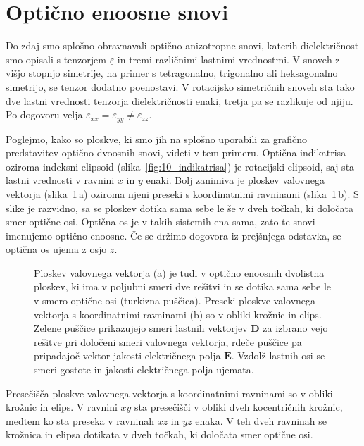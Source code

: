 \section{Optično enoosne snovi}
Do zdaj smo splošno obravnavali optično anizotropne snovi, katerih dielektričnost
smo opisali s tenzorjem $\underline{\varepsilon}$ in tremi različnimi lastnimi vrednostmi. 
V snoveh z višjo stopnjo simetrije, na primer s tetragonalno, trigonalno ali heksagonalno
simetrijo, se tenzor dodatno poenostavi. V rotacijsko simetričnih snoveh sta tako dve lastni 
vrednosti tenzorja dielektričnosti enaki, tretja pa se razlikuje od njiju.
Po dogovoru velja $\varepsilon_{xx} = \varepsilon_{yy}\neq \varepsilon_{zz}$.

Poglejmo, kako so ploskve, ki smo jih na splošno uporabili za grafično predstavitev optično
dvoosnih snovi, videti v tem primeru. Optična indikatrisa oziroma indeksni elipsoid 
(slika~\ref{fig:10_indikatrisa}) je rotacijski elipsoid, saj sta lastni vrednosti
v ravnini $x$ in $y$ enaki. Bolj zanimiva je ploskev valovnega vektorja 
(slika~\ref{fig:10_ploskev_3D_eno}\,a)
oziroma njeni preseki s koordinatnimi ravninami (slika~\ref{fig:10_ploskev_3D_eno}\,b). 
S slike je razvidno, sa se ploskev dotika sama sebe le še v dveh točkah, ki določata 
smer optične osi. Optična os je v takih sistemih ena sama, zato te snovi imenujemo optično 
enoosne. Če se držimo dogovora iz prejšnjega odstavka, se optična os ujema z osjo $z$.
\begin{figure}[h]
\centering
\def\svgwidth{130truemm} 

\caption{Ploskev valovnega vektorja (a) je tudi v optično enoosnih dvolistna ploskev, 
ki ima v poljubni smeri dve rešitvi in se dotika sama sebe le v smero optične osi 
(turkizna puščica). Preseki ploskve valovnega vektorja
s koordinatnimi ravninami (b) so v obliki krožnic in elips.
Zelene puščice prikazujejo smeri lastnih vektorjev $\mathbf{D}$ za izbrano vejo rešitve pri 
določeni smeri valovnega vektorja, rdeče puščice pa pripadajoč vektor jakosti električnega polja 
$\mathbf{E}$. Vzdolž lastnih osi se smeri gostote in jakosti električnega polja ujemata.}
\label{fig:10_ploskev_3D_eno}
\end{figure}

Presečišča ploskve valovnega vektorja s koordinatnimi ravninami so v obliki krožnic
in elips. V ravnini $xy$ sta presečišči v obliki dveh kocentričnih krožnic, medtem ko sta 
preseka v ravninah $xz$ in $yz$ enaka. V teh dveh ravninah
se krožnica in elipsa dotikata v dveh točkah, ki določata smer optične osi.

